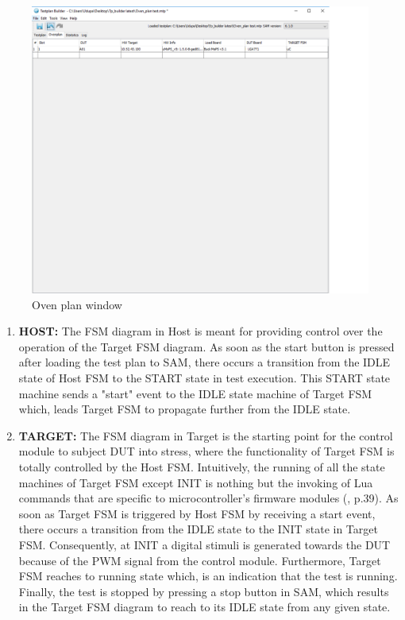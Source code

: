 \begin{figure}[hbt]
		\centering
		\includegraphics[trim=0 600 0 0, clip, width=\textwidth, scale=0.75]{images/Ovenplan_edited.PNG}
		\caption{Oven plan window}
		\label{sec:Oven plan window}
\end{figure}

\begin{enumerate}
\item \textbf{HOST:} The \acrshort{FSM} diagram in Host is meant for providing control over the operation of the Target FSM diagram. 
As soon as the start button is pressed after loading the test plan to SAM, there occurs a transition from the IDLE state of Host FSM to the START state in test execution. 
This START state machine sends a "start" event to the IDLE state machine of Target FSM which, leads Target FSM to propagate further from the IDLE state.
    
\item \textbf{TARGET:} The FSM diagram in Target is the starting point for the control module to subject \acrshort{DUT} into stress, where the functionality of Target FSM is totally controlled by the Host FSM.
Intuitively, the running of all the state machines of Target FSM except INIT is nothing but the invoking of Lua commands that are specific to microcontroller's firmware modules (\cite{Steinwender2016}, p.39). 
As soon as Target FSM is triggered by Host FSM by receiving a start event, there occurs a transition from the IDLE state to the INIT state in Target FSM. 
Consequently, at INIT a digital stimuli is generated towards the DUT because of the PWM signal from the control module. 
Furthermore, Target FSM reaches to running state which, is an indication that the test is running. 
Finally, the test is stopped by pressing a stop button in SAM, which results in the Target FSM diagram to reach to its IDLE state from any given state.  
\end{enumerate}

